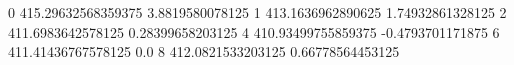 0 415.29632568359375 3.8819580078125
1 413.1636962890625 1.74932861328125
2 411.6983642578125 0.28399658203125
4 410.93499755859375 -0.4793701171875
6 411.41436767578125 0.0
8 412.0821533203125 0.66778564453125

